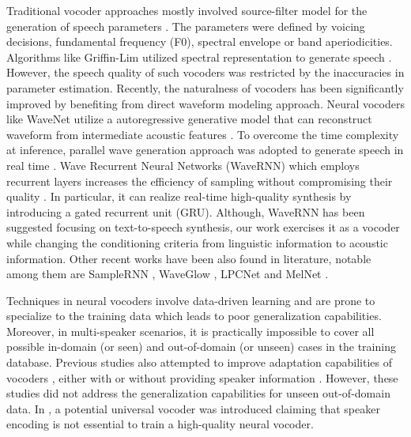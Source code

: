 \documentclass[a4paper]{article}
\begin{document}
Traditional vocoder approaches mostly involved source-filter model for the generation of speech parameters  \cite{mcaulay1986speech, moulines1990pitch, kawahara1999restructuring, morise2016world}. The parameters were defined by voicing decisions, fundamental frequency (F0), spectral envelope or band aperiodicities. Algorithms like Griffin-Lim utilized spectral representation to generate speech \cite{griffin1984signal,perraudin2013fast}. However, the speech quality of such vocoders was restricted by the inaccuracies in parameter estimation. Recently, the naturalness of vocoders has been significantly improved by benefiting from direct waveform modeling approach. Neural vocoders like WaveNet utilize a autoregressive generative model that can reconstruct waveform from intermediate acoustic features \cite{oord2016wavenet, tamamori2017speaker}. To overcome the time complexity at inference, parallel wave generation approach was adopted to generate speech in real time \cite{oord2017parallel, ping2018clarinet}. Wave Recurrent Neural Networks (WaveRNN) which employs recurrent layers increases the efficiency of sampling without compromising their quality \cite{kalchbrenner2018efficient}. In particular, it can realize real-time high-quality synthesis by introducing a gated recurrent unit (GRU). Although, WaveRNN has been suggested focusing on text-to-speech synthesis, our work exercises it as a vocoder while changing the conditioning criteria from linguistic information to acoustic information. Other recent works have been also found in literature, notable among them are SampleRNN \cite{mehri2016samplernn}, WaveGlow \cite{prenger2019waveglow}, LPCNet \cite{valin2019lpcnet} and MelNet \cite{vasquez2019melnet}.

Techniques in neural vocoders involve data-driven learning and are prone to specialize to the training data which leads to poor generalization capabilities. Moreover, in multi-speaker scenarios, it is practically impossible to cover all possible in-domain (or seen) and out-of-domain (or unseen) cases in the training database. Previous studies also attempted to improve adaptation capabilities of vocoders \cite{sisman2018voice}, either with or without providing speaker information \cite{liu2018wavenet, hayashi2017investigation}. However, these studies did not address the generalization capabilities for unseen out-of-domain data. In \cite{lorenzo2018towards}, a potential universal vocoder was introduced claiming that speaker encoding is not essential to train a high-quality neural vocoder.
\end{document}
